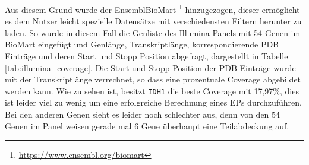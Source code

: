 \begin{table}[]
    \centering
    \caption{Illumina TruSight Myeloid Sequencing Panel Gene \emph{coverage}, Transkriptlänge ist mit UTRs und CDS angegeben.}
    \label{tab:illumina_coverage}
\end{table}

Aus diesem Grund wurde der EnsemblBioMart \footnote{\url{https://www.ensembl.org/biomart}} hinzugezogen, dieser ermöglicht es dem Nutzer leicht spezielle Datensätze mit verschiedensten Filtern herunter zu laden. So wurde in diesem Fall die Genliste des Illumina Panels mit 54 Genen im BioMart eingefügt und Genlänge, Transkriptlänge, korrespondierende \ac{PDB} Einträge und deren Start und Stopp Position abgefragt, dargestellt in Tabelle \ref{tab:illumina_coverage}. Die Start und Stopp Position der \ac{PDB} Einträge wurde mit der Transkriptlänge verrechnet, so dass eine prozentuale Coverage abgebildet werden kann. Wie zu sehen ist, besitzt \texttt{IDH1} die beste Coverage mit 17,97\%, dies ist leider viel zu wenig um eine erfolgreiche Berechnung eines \ac{EP}s durchzuführen. Bei den anderen Genen sieht es leider noch schlechter aus, denn von den 54 Genen im Panel weisen gerade mal 6 Gene überhaupt eine Teilabdeckung auf. 

